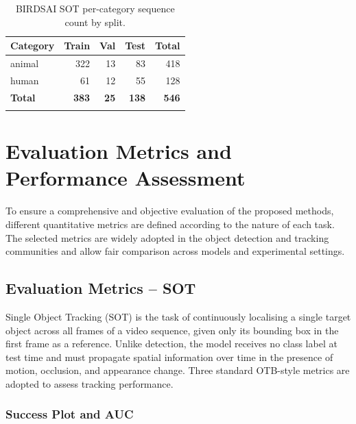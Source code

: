 \documentclass[11pt]{article}
\begin{document}
\renewcommand{\arraystretch}{1.3}
\begin{longtable}[c]{@{}lrrrr@{}}
\rowcolor{gray!20}
\textbf{Category} & \textbf{Train} & \textbf{Val} & \textbf{Test} & \textbf{Total} \\
\midrule
\endhead
animal         & 322 & 13 &  83 & 418 \\
human          &  61 & 12 &  55 & 128 \\
\midrule
\textbf{Total} & \textbf{383} & \textbf{25} & \textbf{138} & \textbf{546} \\
\caption{BIRDSAI SOT per-category sequence count by split.\label{tab:birdsai-sot-category}}\\
\end{longtable}
\renewcommand{\arraystretch}{1}


\setlength{\LTpre}{\bigskipamount}
\setlength{\LTpost}{\bigskipamount}

\hypertarget{Evaluation Metrics and Performance Assessment}{%
\section{Evaluation Metrics and Performance Assessment}\label{Evaluation Metrics and Performance Assessment}}

To ensure a comprehensive and objective evaluation of the proposed methods, different quantitative metrics are defined according to the nature of each task. 
The selected metrics are widely adopted in the object detection and tracking communities and allow fair comparison across models and experimental settings. 

\hypertarget{Evaluation Metrics - SOT}{%
\subsection{Evaluation Metrics -- SOT}\label{Evaluation Metrics - SOT}}

Single Object Tracking (SOT) is the task of continuously localising a single target object across all frames of a video sequence, given only its bounding box in the first frame as a reference. Unlike detection, 
the model receives no class label at test time and must propagate spatial information over time in the presence of motion, occlusion, and appearance change. Three standard OTB-style metrics are adopted to assess tracking performance.

\subsubsection*{Success Plot and AUC}
\end{document}
